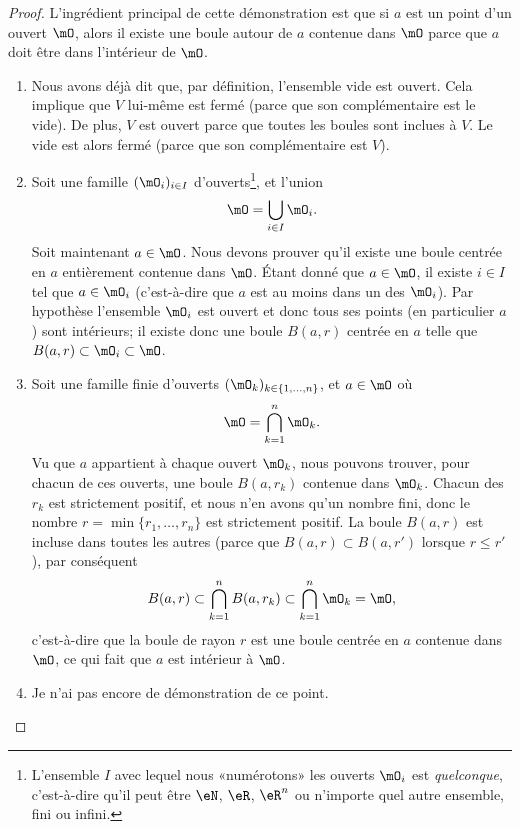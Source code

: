 \begin{proof}
	L'ingrédient principal de cette démonstration est que si \( a\) est un point d'un ouvert \( \mO\), alors il existe une boule autour de \( a\) contenue dans \( \mO\) parce que \( a\) doit être dans l'intérieur de \( \mO\).
	\begin{enumerate}

		\item
		      Nous avons déjà dit que, par définition, l'ensemble vide est ouvert. Cela implique que \( V\) lui-même est fermé (parce que son complémentaire est le vide). De plus, \( V\) est ouvert parce que toutes les boules sont inclues à \( V\). Le vide est alors fermé (parce que son complémentaire est \( V\)).
		\item
		      Soit une famille \( (\mO_i)_{i\in I}\) d'ouverts\footnote{L'ensemble \( I\) avec lequel nous «numérotons» les ouverts \( \mO_i\) est \emph{quelconque}, c'est-à-dire qu'il peut être \( \eN\), \( \eR\), \( \eR^n\) ou n'importe quel autre ensemble, fini ou infini.}, et l'union
		      \begin{equation}
			      \mO=\bigcup_{i\in I}\mO_i.
		      \end{equation}
		      Soit maintenant \( a\in\mO\). Nous devons prouver qu'il existe une boule centrée en \( a\) entièrement contenue dans \( \mO\). Étant donné que \( a\in\mO\), il existe \( i\in I\) tel que \( a\in\mO_i\) (c'est-à-dire que \( a\) est au moins dans un des \( \mO_i\)). Par hypothèse l'ensemble \( \mO_i\) est ouvert et donc tous ses points (en particulier \( a\)) sont intérieurs; il existe donc une boule \( B(a,r)\) centrée en \( a\) telle que \( B(a,r)\subset\mO_i\subset\mO\).

		\item
		      Soit une famille finie d'ouverts \( (\mO_k)_{k\in\{ 1,\ldots,n \}}\), et \( a\in\mO\) où
		      \begin{equation}
			      \mO=\bigcap_{k=1}^n\mO_k.
		      \end{equation}
		      Vu que \( a\) appartient à chaque ouvert \( \mO_k\), nous pouvons trouver, pour chacun de ces ouverts, une boule \( B(a,r_k)\) contenue dans \( \mO_k\). Chacun des \( r_k\) est strictement positif, et nous n'en avons qu'un nombre fini, donc le nombre \( r=\min\{ r_1,\ldots,r_n \}\) est strictement positif. La boule \( B(a,r)\) est incluse dans toutes les autres (parce que \( B(a,r)\subset B(a,r')\) lorsque \( r\leq r'\)), par conséquent
		      \begin{equation}
			      B(a,r)\subset\bigcap_{k=1}^nB(a,r_k)\subset\bigcap_{k=1}^n\mO_k=\mO,
		      \end{equation}
		      c'est-à-dire que la boule de rayon \( r\) est une boule centrée en \( a\) contenue dans \( \mO\), ce qui fait que \( a\) est intérieur à \( \mO\).
		\item
		      Je n'ai pas encore de démonstration de ce point.
	\end{enumerate}
\end{proof}

